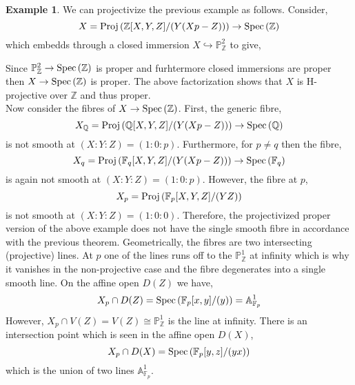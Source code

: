 \documentclass[12pt]{extarticle}
\newcommand{\Z}{\mathbb{Z}}
\theoremstyle{definition}
\newtheorem{example}[theorem]{Example}
\renewcommand{\P}{\mathbb{P}}
\newcommand{\embed}{\hookrightarrow}
\newcommand{\A}{\mathbb{A}}
\begin{document}
\begin{example}
We can projectivize the previous example as follows. Consider,
\[ X = \Proj{\Z[X, Y, Z] / (Y(X p - Z))} \to \Spec{\Z} \]
which embedds through a closed immersion $X \embed \P_\Z^2$ to give,
\begin{center}
\end{center}
Since $\P^2_\Z \to \Spec{\Z}$ is proper and furhtermore closed immersions are proper then $X \to \Spec{\Z}$ is proper. The above factorization shows that $X$ is H-projective over $\Z$ and thus proper.
\bigskip\\
Now consider the fibres of $X \to \Spec{\Z}$. First, the generic fibre,
\[ X_{\mathbb{Q}} = \mathrm{Proj}\left(\mathbb{Q}[X,Y,Z]/(Y(X p - Z))\right) \to \mathrm{Spec}\left(\mathbb{Q}\right) \]
is not smooth at $(X : Y : Z) = (1 : 0 : p)$. Furthermore, for $p \neq q$ then the fibre,
\[ X_q = \mathrm{Proj}\left(\mathbb{F}_q[X, Y, Z]/(Y(X p - Z))\right) \to \mathrm{Spec}\left(\mathbb{F}_q\right) \]
is again not smooth at $(X : Y : Z) = (1 : 0 : p)$. However, the fibre at $p$,
\[ X_p = \mathrm{Proj}\left(\mathbb{F}_p[X, Y, Z] / (YZ)\right) \]
is not smooth at $(X : Y : Z) = (1 : 0 : 0)$. Therefore, the projectivized proper version of the above example does not have the single smooth fibre in accordance with the previous theorem. Geometrically, the fibres are two intersecting (projective) lines. At $p$ one of the lines runs off to the $\P^1_\Z$ at infinity which is why it vanishes in the non-projective case and the fibre degenerates into a single smooth line. On the affine open $D(Z)$ we have,
\[ X_p \cap D(Z) = \Spec{\mathbb{F}_p[x, y]/(y)} = \A^1_{\mathbb{F}_p} \]
However, $X_p \cap V(Z) = V(Z) \cong \P^1_\Z$ is the line at infinity. There is an intersection point which is seen in the affine open $D(X)$,
\[ X_p \cap D(X) = \mathrm{Spec}\left(\mathbb{F}_p[y, z]/(yx)\right) \]
which is the union of two lines $\A^1_{\mathbb{F}_p}$. 
\end{example}                                                          
\end{document}
